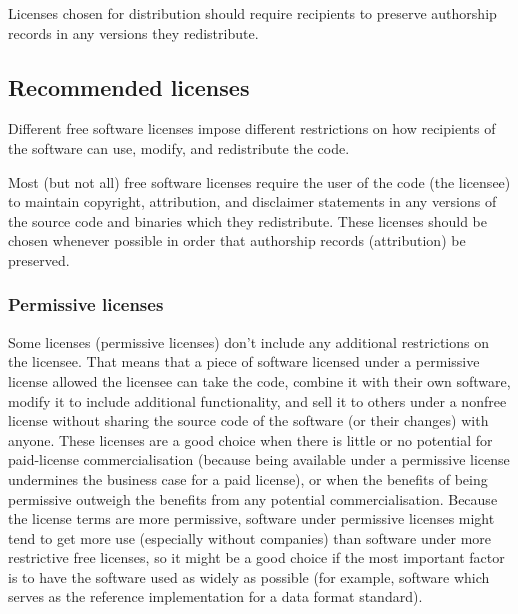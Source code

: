 \documentclass[10pt,a4paper]{article}
\begin{document}
\par Licenses chosen for distribution should require  recipients to preserve
authorship records in any versions they redistribute. 


\subsection{Recommended licenses}
\label{section:impnotes.recommended}

\par Different free software licenses impose different restrictions on how recipients 
of the software can use, modify, and redistribute the code. 

\par Most (but not all) free software licenses require the user of the code (the licensee) 
to maintain copyright, attribution, and disclaimer statements in any versions of the 
source code and binaries which they redistribute. These licenses should be chosen 
whenever possible in order that authorship records (attribution) be preserved. 

\subsubsection{Permissive licenses}
\par Some licenses (permissive licenses) don't include any additional restrictions on 
the licensee. That means that a piece of software licensed under a permissive 
license allowed the licensee can take the code, combine it with their own software, 
modify it to include additional functionality, and sell it to others under a nonfree 
license without sharing the source code of the software (or their changes) with anyone. 
These licenses are a good choice when there is little or no potential for paid-license 
commercialisation (because being available under a permissive license undermines 
the business case for a paid license), or when the benefits of being permissive outweigh 
the benefits from any potential commercialisation. Because the license terms are 
more permissive, software under permissive licenses might tend to get more use 
(especially without companies) than software under more restrictive free licenses, 
so it might be a good choice if the most important factor is to have the software used 
as widely as possible (for example, software which serves as the reference 
implementation for a data format standard). 
\end{document}
